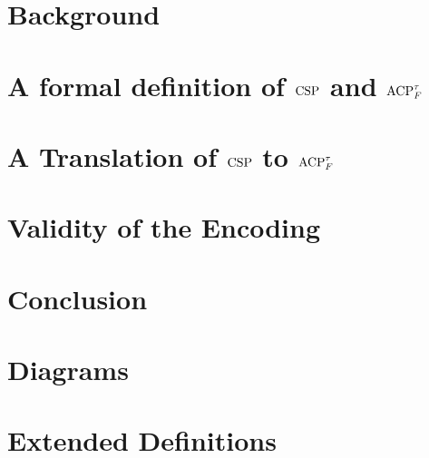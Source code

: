 \documentclass[logo,bsc,singlespacing,parskip,online]{infthesis}
\begin{document}
\chapter{Background}


\chapter{A formal definition of \texorpdfstring{$\mathrm{CSP}$}{CSP} and \texorpdfstring{$\mathrm{ACP}_{F}^{\tau}$}{ACP}}


\chapter{A Translation of \texorpdfstring{$\mathrm{CSP}$}{CSP} to \texorpdfstring{$\mathrm{ACP}_{F}^{\tau}$}{ACP}}



\newpage
\chapter{Validity of the Encoding}


\chapter{Conclusion}






\appendix

\chapter{Diagrams}


\chapter{Extended Definitions}

\end{document}
